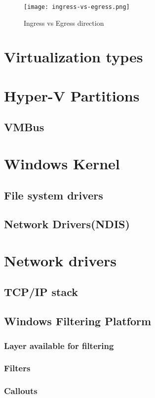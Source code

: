 \begin{figure}[h]
\centering
\texttt{[image: ingress-vs-egress.png]}
\caption{Ingress vs Egress direction}
\label{ingress-vs-egress}
\end{figure}

\section{Virtualization types}
\section{Hyper-V Partitions}
\subsection{VMBus}
\section{Windows Kernel}
\subsection{File system drivers}
\subsection{Network Drivers(NDIS)}
\section{Network drivers}
\subsection{TCP/IP stack}
\subsection{Windows Filtering Platform}
\subsubsection{Layer available for filtering}
\subsubsection{Filters}
\subsubsection{Callouts}

